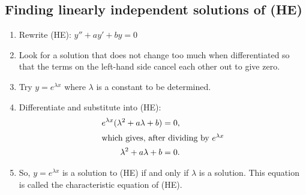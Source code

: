\documentclass{report}
\begin{document}
		\subsection{Finding linearly independent solutions of (HE)}

			\begin{enumerate}
				\item Rewrite (HE): $y'' + ay' + by = 0$
				\item Look for a solution that does not change too much when differentiated so that the terms on the left-hand side cancel each other out to give zero.
				\item Try $y = e^{\lambda x}$ where $\lambda$ is a constant to be determined.
				\item Differentiate and substitute into (HE):
					\begin{align*}
						e^{\lambda x} (\lambda^2 + a\lambda + b) = 0,	\\
						\intertext{which gives, after dividing by $e^{\lambda x}$}
						\lambda^2 + a \lambda + b = 0.
					\end{align*}
				\item So, $y = e^{\lambda x}$ is a solution to (HE) if and only if $\lambda$ is a solution. This equation is called the characteristic equation of (HE).
			\end{enumerate}
\end{document}
